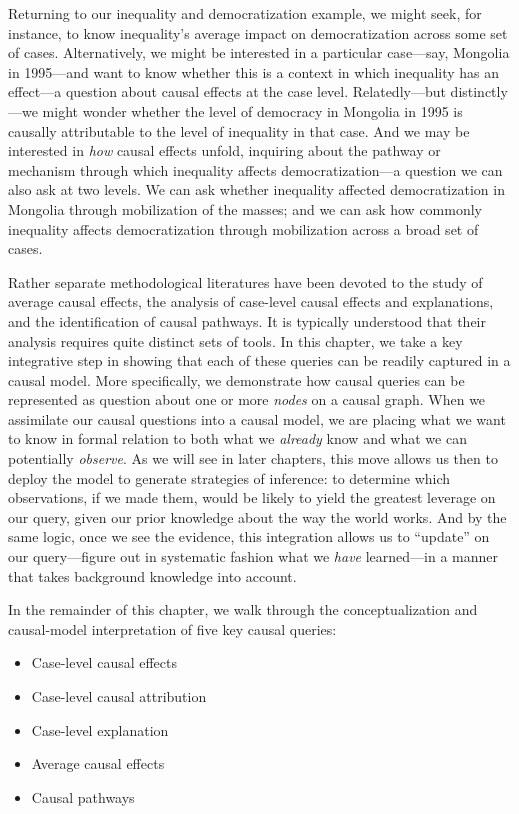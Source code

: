 \documentclass[12pt,]{book}
\begin{document}
Returning to our inequality and democratization example, we might seek, for instance, to know inequality's average impact on democratization across some set of cases. Alternatively, we might be interested in a particular case---say, Mongolia in 1995---and want to know whether this is a context in which inequality has an effect---a question about causal effects at the case level. Relatedly---but distinctly---we might wonder whether the level of democracy in Mongolia in 1995 is causally attributable to the level of inequality in that case. And we may be interested in \emph{how} causal effects unfold, inquiring about the pathway or mechanism through which inequality affects democratization---a question we can also ask at two levels. We can ask whether inequality affected democratization in Mongolia through mobilization of the masses; and we can ask how commonly inequality affects democratization through mobilization across a broad set of cases.

Rather separate methodological literatures have been devoted to the study of average causal effects, the analysis of case-level causal effects and explanations, and the identification of causal pathways. It is typically understood that their analysis requires quite distinct sets of tools. In this chapter, we take a key integrative step in showing that each of these queries can be readily captured in a causal model. More specifically, we demonstrate how causal queries can be represented as question about one or more \emph{nodes} on a causal graph. When we assimilate our causal questions into a causal model, we are placing what we want to know in formal relation to both what we \emph{already} know and what we can potentially \emph{observe}. As we will see in later chapters, this move allows us then to deploy the model to generate strategies of inference: to determine which observations, if we made them, would be likely to yield the greatest leverage on our query, given our prior knowledge about the way the world works. And by the same logic, once we see the evidence, this integration allows us to ``update'' on our query---figure out in systematic fashion what we \emph{have} learned---in a manner that takes background knowledge into account.

In the remainder of this chapter, we walk through the conceptualization and causal-model interpretation of five key causal queries:

\begin{itemize}
\item
  Case-level causal effects
\item
  Case-level causal attribution
\item
  Case-level explanation
\item
  Average causal effects
\item
  Causal pathways
\end{itemize}
\end{document}
